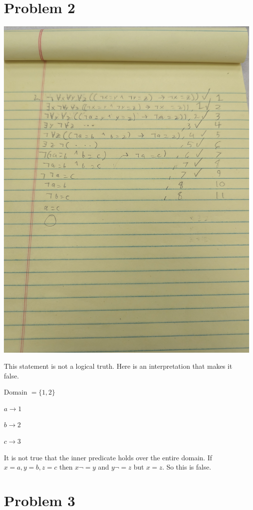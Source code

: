 \documentclass[12pt]{article}
\begin{document}
\section*{Problem 2}

\includegraphics[width=\textwidth]{2}

This statement is not a logical truth. Here is an interpretation that makes it false. 

Domain $ = \{1, 2\}$

$a \rightarrow 1$

$b \rightarrow 2$

$c \rightarrow 3$

It is not true that the inner predicate holds over the entire domain. If $x = a, y= b, z = c$ then $x \lnot = y$ and $y \lnot = z$ but $x = z$. So this is false. 


\section*{Problem 3}
\end{document}
